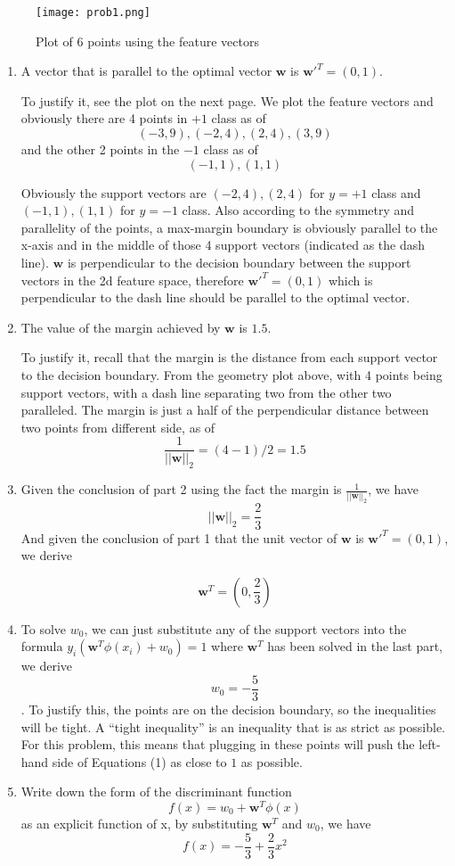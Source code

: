\documentclass[submit]{harvardml}
\begin{document}
\begin{figure}
    \centering
    \texttt{[image: prob1.png]}
    \caption{Plot of 6 points using the feature vectors}
\end{figure}

\begin{enumerate}
  \item A vector that is parallel to the optimal vector $\mathbf{w}$ is $\mathbf{w}'^T = (0,1)$.
  
  To justify it, see the plot on the next page. We plot the feature vectors and obviously there are 4 points in $+1$ class as of $$(-3,9),(-2,4),(2,4),(3,9)$$ and the other 2 points in the $-1$ class as of $$(-1,1), (1,1)$$
  
  Obviously the support vectors are $(-2,4), (2,4)$ for $y=+1$ class and $(-1,1), (1,1)$ for $y=-1$ class. Also according to the symmetry and parallelity of the points, a max-margin boundary is obviously parallel to the x-axis and in the middle of those 4 support vectors (indicated as the dash line). $\mathbf{w}$ is perpendicular to the decision boundary between the support vectors in the 2d feature space, therefore $\mathbf{w}'^T = (0,1)$ which is perpendicular to the dash line should be parallel to the optimal vector.
  
  \item The value of the margin achieved by $\mathbf{w}$ is $1.5$.
  
  To justify it, recall that the margin is the distance from each support vector to the decision boundary. From the geometry plot above, with 4 points being support vectors, with a dash line separating two from the other two paralleled. The margin is just a half of the perpendicular distance between two points from different side, as of
  $$ \frac{1}{||\mathbf{w}||_2} = (4 - 1) / 2 = 1.5 $$
  
  \item Given the conclusion of part 2 using the fact the margin is $\frac{1}{||\mathbf{w}||_2}$, we have 
  $$ ||\mathbf{w}||_2 = \frac{2}{3} $$
  And given the conclusion of part 1 that the unit vector of $\mathbf{w}$ is $\mathbf{w}'^T=(0,1)$, we derive

  $$ \mathbf{w}^T = (0, \frac{2}{3}) $$
  
  \item To solve $w_0$, we can just substitute any of the support vectors into the formula $y_i(\mathbf{w}^T\phi(x_i) + w_0) = 1$ where $\mathbf{w}^T$ has been solved in the last part, we derive $$w_0=-\frac{5}{3}$$. To justify this, the points are on the decision boundary, so the inequalities will be tight. A “tight inequality” is an inequality that is as strict as possible. For this problem, this means that plugging in these points will push the left-hand side of Equations (1) as close to $1$ as possible.
  
  \item Write down the form of the discriminant function 
  $$ f(x) = w_0+ \mathbf{w}^T \phi(x) $$ as an explicit function
  of x, by substituting $\mathbf{w}^T$ and $w_0$, we have
  $$ f(x) = -\frac{5}{3} + \frac{2}{3}x^2 $$
  
\end{enumerate}
\end{document}
